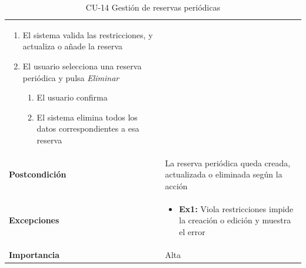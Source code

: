 \begin{table}[p]
\begin{tabularx}{\linewidth}{ p{} p{} }
\begin{enumerate}
			\item El sistema valida las restricciones, y actualiza o añade la reserva
			\item El usuario selecciona una reserva periódica y pulsa \emph{Eliminar}
			\begin{enumerate}[label*=\arabic*., itemsep=0.5pt, topsep=0.5pt, leftmargin=1em]
				\tightlist
				\item El usuario confirma
				\item El sistema elimina todos los datos correspondientes a esa reserva
			\end{enumerate}			
		\end{enumerate}\\
		\textbf{Postcondición} & La reserva periódica queda creada, actualizada o eliminada según la acción     \\
		\textbf{Excepciones}          & 
		\begin{itemize}
			\tightlist
			\item \textbf{Ex1:} Viola restricciones \textrightarrow{} impide la creación o edición y muestra el error
		\end{itemize} \\
		\textbf{Importancia}          & Alta \\
		\bottomrule
	\end{tabularx}
	\caption{CU-14 Gestión de reservas periódicas}
\end{table}
	
